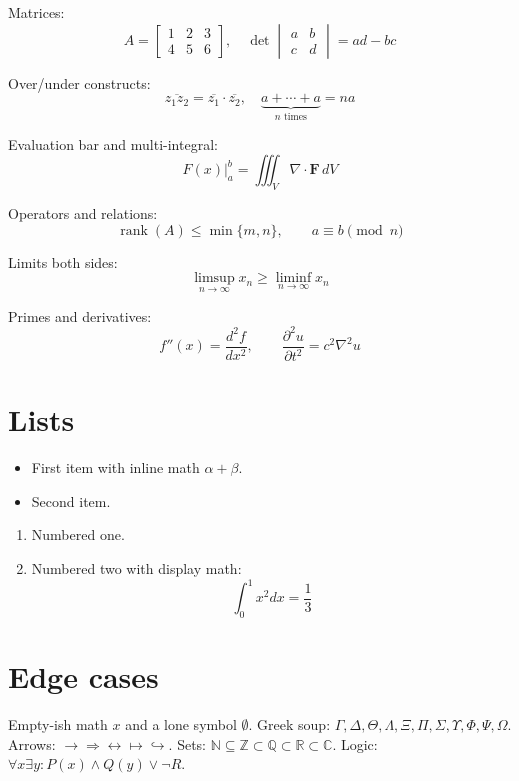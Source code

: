 \documentclass{article}
\begin{document}
Matrices:
\begin{equation}
  A = \begin{bmatrix} 1 & 2 & 3 \\ 4 & 5 & 6 \end{bmatrix}, \quad
  \det \begin{vmatrix} a & b \\ c & d \end{vmatrix} = ad - bc
\end{equation}

Over/under constructs:
\begin{equation}
  \overline{z_{1} z_{2}} = \overline{z_{1}} \cdot \overline{z_{2}}, \quad
  \underbrace{a + \cdots + a}_{n \text{ times}} = na
\end{equation}

Evaluation bar and multi-integral:
\begin{equation}
  \left. F(x) \right|_{a}^{b} = \iiint_{V}{\nabla \cdot \mathbf{F} \, dV}
\end{equation}

Operators and relations:
\begin{equation}
  \operatorname{rank}(A) \leq \min{\{ m, n \}}, \qquad
  a \equiv b \pmod{n}
\end{equation}

Limits both sides:
\begin{equation}
  \limsup_{n \to \infty}{x_{n}} \geq \liminf_{n \to \infty}{x_{n}}
\end{equation}

Primes and derivatives:
\begin{equation}
  f''(x) = \frac{d^{2} f}{d x^{2}}, \qquad
  \frac{\partial^{2} u}{\partial t^{2}} = c^{2} \nabla^{2} u
\end{equation}

\section{Lists}
\begin{itemize}
  \item First item with inline math $\alpha + \beta$.
  \item Second item.
\end{itemize}

\begin{enumerate}
  \item Numbered one.
  \item Numbered two with display math:
  \begin{equation*}
    \int_{0}^{1}{x^{2} dx} = \frac{1}{3}
  \end{equation*}
\end{enumerate}

\section{Edge cases}
Empty-ish math $x$ and a lone symbol $\emptyset$.
Greek soup: $\Gamma, \Delta, \Theta, \Lambda, \Xi, \Pi, \Sigma, \Upsilon, \Phi, \Psi, \Omega$.
Arrows: $\rightarrow \Rightarrow \leftrightarrow \mapsto \hookrightarrow$.
Sets: $\mathbb{N} \subseteq \mathbb{Z} \subset \mathbb{Q} \subset \mathbb{R} \subset \mathbb{C}$.
Logic: $\forall x \exists y : P(x) \wedge Q(y) \vee \neg R$.
\end{document}
